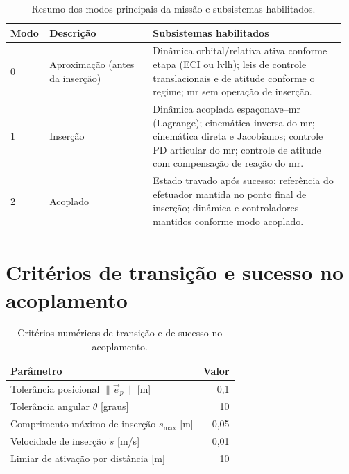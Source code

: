 \begin{table}[H]
\centering
\caption{Resumo dos modos principais da missão e subsistemas habilitados.}
\label{ttab_apD_modos_missao}
\small
\begin{tabular}{p{0.10\linewidth}p{0.30\linewidth}p{0.56\linewidth}}
\toprule
\textbf{Modo} & \textbf{Descrição} & \textbf{Subsistemas habilitados} \\
\midrule
0 & Aproximação (antes da inserção) &
Dinâmica orbital/relativa ativa conforme etapa (ECI ou \gls{lvlh}); leis de controle translacionais e de atitude conforme o regime; \gls{mr} sem operação de inserção. \\
1 & Inserção &
Dinâmica acoplada espaçonave--\gls{mr} (Lagrange); cinemática inversa do \gls{mr}; cinemática direta e Jacobianos; controle PD articular do \gls{mr}; controle de atitude com compensação de reação do \gls{mr}. \\
2 & Acoplado &
Estado travado após sucesso: referência do efetuador mantida no ponto final de inserção; dinâmica e controladores mantidos conforme modo acoplado. \\
\bottomrule
\end{tabular}
\end{table}

\section{Critérios de transição e sucesso no acoplamento}
\label{apD_criterios_transicao_docking}

\begin{table}[H]
\centering
\caption{Critérios numéricos de transição e de sucesso no acoplamento.}
\label{ttab_apD_criterios_docking}
\begin{tabular}{lr}
\toprule
\textbf{Parâmetro} & \textbf{Valor} \\
\midrule
Tolerância posicional $\|\vec{e}_p\|$ [m] & 0,1 \\
Tolerância angular $\theta$ [graus] & 10 \\
Comprimento máximo de inserção $s_{\max}$ [m] & 0,05 \\
Velocidade de inserção $\dot{s}$ [m/s] & 0,01 \\
Limiar de ativação por distância [m] & 10 \\
\bottomrule
\end{tabular}
\end{table}


